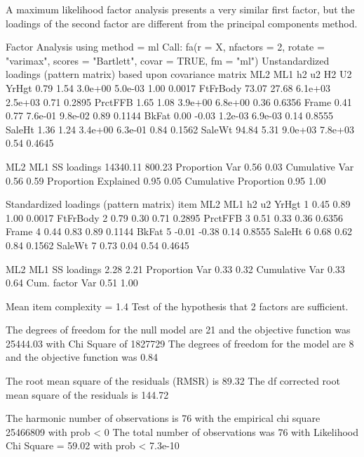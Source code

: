 A maximum likelihood factor analysis presents a very similar first factor, but the loadings of the second factor are different from the principal components method. 

\begin{rc}

Factor Analysis using method =  ml
Call: fa(r = X, nfactors = 2, rotate = "varimax", scores = "Bartlett", 
    covar = TRUE, fm = "ml")
Unstandardized loadings (pattern matrix) based upon covariance matrix
           ML2   ML1      h2      u2   H2     U2
YrHgt     0.79  1.54 3.0e+00 5.0e-03 1.00 0.0017
FtFrBody 73.07 27.68 6.1e+03 2.5e+03 0.71 0.2895
PrctFFB   1.65  1.08 3.9e+00 6.8e+00 0.36 0.6356
Frame     0.41  0.77 7.6e-01 9.8e-02 0.89 0.1144
BkFat     0.00 -0.03 1.2e-03 6.9e-03 0.14 0.8555
SaleHt    1.36  1.24 3.4e+00 6.3e-01 0.84 0.1562
SaleWt   94.84  5.31 9.0e+03 7.8e+03 0.54 0.4645

                           ML2    ML1
SS loadings           14340.11 800.23
Proportion Var            0.56   0.03
Cumulative Var            0.56   0.59
Proportion Explained      0.95   0.05
Cumulative Proportion     0.95   1.00

 Standardized loadings (pattern matrix)
         item   ML2   ML1   h2     u2
YrHgt       1  0.45  0.89 1.00 0.0017
FtFrBody    2  0.79  0.30 0.71 0.2895
PrctFFB     3  0.51  0.33 0.36 0.6356
Frame       4  0.44  0.83 0.89 0.1144
BkFat       5 -0.01 -0.38 0.14 0.8555
SaleHt      6  0.68  0.62 0.84 0.1562
SaleWt      7  0.73  0.04 0.54 0.4645

                 ML2  ML1
SS loadings     2.28 2.21
Proportion Var  0.33 0.32
Cumulative Var  0.33 0.64
Cum. factor Var 0.51 1.00

Mean item complexity =  1.4
Test of the hypothesis that 2 factors are sufficient.

The degrees of freedom for the null model are  21  and the objective function was  25444.03 with Chi Square of  1827729
The degrees of freedom for the model are 8  and the objective function was  0.84 

The root mean square of the residuals (RMSR) is  89.32 
The df corrected root mean square of the residuals is  144.72 

The harmonic number of observations is  76 with the empirical chi square  25466809  with prob <  0 
The total number of observations was  76  with Likelihood Chi Square =  59.02  with prob <  7.3e-10

\end{rc}

